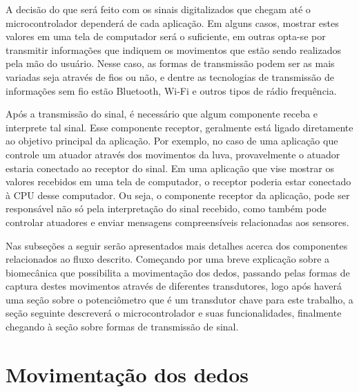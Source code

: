 \documentclass[
	12pt,				%
	openright,			%
	oneside,			%
	a4paper,			%
	english,			%
	brazil				%
	]{abntex2}
\begin{document}
		A decisão do que será feito com os sinais digitalizados que chegam até o microcontrolador dependerá de cada aplicação. Em alguns casos, mostrar estes valores em uma tela de computador será o suficiente, em outras opta-se por transmitir informações que indiquem os movimentos que estão sendo realizados pela mão do usuário. Nesse caso, as formas de transmissão podem ser as mais variadas seja através de fios ou não, e dentre as tecnologias de transmissão de informações sem fio estão Bluetooth, Wi-Fi e outros tipos de rádio frequência.

		Após a transmissão do sinal, é necessário que algum componente receba e interprete tal sinal. Esse componente receptor, geralmente está ligado diretamente ao objetivo principal da aplicação. Por exemplo, no caso de uma aplicação que controle um atuador através dos movimentos da luva, provavelmente o atuador estaria conectado ao receptor do sinal. Em uma aplicação que vise mostrar os valores recebidos em uma tela de computador, o receptor poderia estar conectado à CPU desse computador. Ou seja, o componente receptor da aplicação, pode ser responsável não só pela interpretação do sinal recebido, como também pode controlar atuadores e enviar mensagens compreensíveis relacionadas aos sensores.

		Nas subseções a seguir serão apresentados mais detalhes acerca dos componentes relacionados ao fluxo descrito. Começando por uma breve explicação sobre a biomecânica que possibilita a movimentação dos dedos, passando pelas formas de captura destes movimentos através de diferentes transdutores, logo após haverá uma seção sobre o potenciômetro que é um transdutor chave para este trabalho, a seção seguinte descreverá o microcontrolador e suas funcionalidades, finalmente chegando à seção sobre formas de transmissão de sinal.





		\section{Movimentação dos dedos} \label{sec:movimentacaodosdedos}
\end{document}
